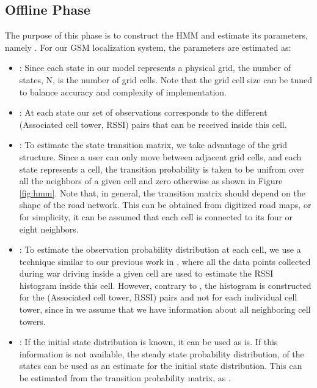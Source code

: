\documentclass[conference]{IEEEtran}
\begin{document}
\subsection{Offline Phase}
The purpose of this phase is to construct the HMM and estimate its
parameters, namely . For our GSM localization
system, the parameters are estimated as:
\begin{itemize}
  \item : Since each state in our model represents a physical
  grid, the number of states, N, is the number of grid cells. Note
  that the grid cell size can be tuned to balance accuracy and
  complexity of implementation.

  \item : At each state our set of observations corresponds to the different (Associated cell tower,
  RSSI) pairs that can be received inside this cell.

  \item : To estimate the state transition matrix, we take
  advantage of the grid structure. Since a user can only move
  between adjacent grid cells, and each state represents a cell, the
  transition probability is taken to be unifrom over all the neighbors of a given cell and zero otherwise as shown in Figure
  \ref{fig:hmm}. Note that, in general, the transition matrix should
  depend on the shape of the road network. This can be obtained from
  digitized road maps, or for simplicity, it can be assumed that
  each cell is connected to its four or eight neighbors.

  \item : To estimate the observation probability distribution at
  each cell, we use a technique similar to our previous work in
  \cite{CellSense}, where all the data points collected during war driving inside a given cell are used to estimate the RSSI histogram inside this cell.
  However, contrary to \cite{CellSense}, the histogram is constructed for the (Associated cell tower, RSSI)
  pairs and not for each individual cell tower, since in \cite{CellSense} we assume that we have information about all neighboring cell towers.

  \item : If the initial state distribution is known, it can be used as is. If this information is not available, the steady state probability
  distribution, 
  of the states can be used as an estimate for the initial state distribution. This can be estimated from the transition probability matrix, 
  as .
\end{itemize}
\end{document}
